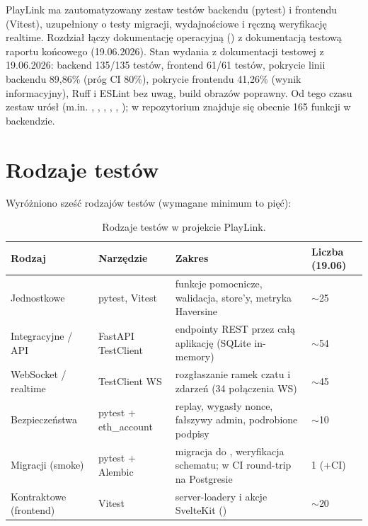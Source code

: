 PlayLink ma zautomatyzowany zestaw testów backendu (pytest) i frontendu (Vitest),
uzupełniony o testy migracji, wydajnościowe i ręczną weryfikację realtime.
Rozdział łączy dokumentację operacyjną () z
dokumentacją testową raportu końcowego (19.06.2026). Stan wydania z dokumentacji
testowej z 19.06.2026: backend 135/135 testów, frontend 61/61 testów, pokrycie linii
backendu 89,86\% (próg CI 80\%), pokrycie frontendu 41,26\% (wynik informacyjny),
Ruff i ESLint bez uwag, build obrazów poprawny. Od tego czasu zestaw urósł (m.in.
, , ,
, , );
w repozytorium znajduje się obecnie 165 funkcji  w backendzie.

\section{Rodzaje testów}
\label{sec:op-rodzaje-testow}

Wyróżniono sześć rodzajów testów (wymagane minimum to pięć):

\begin{table}[H]
\centering\small
\begin{tabularx}{\textwidth}{@{}p{}p{}Yp{0.12\textwidth}@{}}
\toprule
\textbf{Rodzaj} & \textbf{Narzędzie} & \textbf{Zakres} & \textbf{Liczba (19.06)} \\
\midrule
Jednostkowe & pytest, Vitest & funkcje pomocnicze, walidacja, store'y, metryka Haversine & $\sim$25 \\
Integracyjne / API & FastAPI TestClient & endpointy REST przez całą aplikację (SQLite in-memory) & $\sim$54 \\
WebSocket / realtime & TestClient WS & rozgłaszanie ramek czatu i zdarzeń (34 połączenia WS) & $\sim$45 \\
Bezpieczeństwa & pytest + eth\_account & replay, wygasły nonce, fałszywy admin, podrobione podpisy & $\sim$10 \\
Migracji (smoke) & pytest + Alembic & migracja do , weryfikacja schematu; w CI round-trip na Postgresie & 1 (+CI) \\
Kontraktowe (frontend) & Vitest & server-loadery i akcje SvelteKit () & $\sim$20 \\
\bottomrule
\end{tabularx}
\caption{Rodzaje testów w projekcie PlayLink.}
\end{table}


